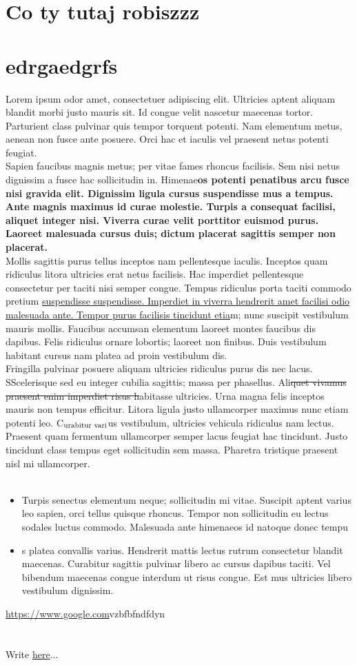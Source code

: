 \documentclass{article}
\begin{document}
\section{Co ty tutaj robiszzz}
\section{edrgaedgrfs}
Lorem ipsum odor amet, consectetuer adipiscing elit. Ultricies aptent aliquam blandit morbi justo mauris sit. Id congue velit nascetur maecenas tortor. Parturient class pulvinar quis tempor torquent potenti. Nam elementum metus, aenean non fusce ante posuere. Orci hac et iaculis vel praesent netus potenti feugiat.\\Sapien faucibus magnis metus; per vitae fames rhoncus facilisis. Sem nisi netus dignissim a fusce hac sollicitudin in. Himenae\textbf{os potenti penatibus arcu fusce nisi gravida elit. Dignissim ligula cursus suspendisse mus a tempus. Ante magnis maximus id curae molestie. Turpis a consequat facilisi, aliquet integer nisi. Viverra curae velit porttitor euismod purus. Laoreet malesuada cursus duis; dictum placerat sagittis semper non placerat.}\\Mollis sagittis purus tellus inceptos nam pellentesque iaculis. Inceptos quam ridiculus litora ultricies erat netus facilisis. Hac imperdiet pellentesque consectetur per taciti nisi semper congue. Tempus ridiculus porta taciti commodo pretium \uline{suspendisse suspendisse. Imperdiet in viverra hendrerit amet facilisi odio malesuada ante. Tempor purus facilisis tincidunt etia}m; nunc suscipit vestibulum mauris mollis. Faucibus accumsan elementum laoreet montes faucibus dis dapibus. Felis ridiculus ornare lobortis; laoreet non finibus. Duis vestibulum habitant cursus nam platea ad proin vestibulum dis.\\Fringilla pulvinar posuere aliquam ultricies ridiculus purus dis nec lacus. SScelerisque sed eu integer cubilia sagittis; massa per phasellus. Ali\sout{quet vivamus praesent enim imperdiet risus h}abitasse ultricies. Urna magna felis inceptos mauris non tempus efficitur. Litora ligula justo ullamcorper maximus nunc etiam potenti leo. C$_{\textnormal{urabitur vari}}$us vestibulum, ultricies vehicula ridiculus nam lectus. Praesent quam fermentum ullamcorper semper lacus feugiat hac tincidunt. Justo tincidunt class tempus eget sollicitudin sem massa. Pharetra tristique praesent nisl mi ullamcorper.\\\\\begin{itemize}\item Turpis senectus elementum neque; sollicitudin mi vitae. Suscipit aptent varius leo sapien, orci tellus quisque rhoncus. Tempor non sollicitudin eu lectus sodales luctus commodo. Malesuada ante himenaeos id natoque donec tempu\item s platea convallis varius. Hendrerit mattis lectus rutrum consectetur blandit maecenas. Curabitur sagittis pulvinar libero ac cursus dapibus taciti. Vel bibendum maecenas congue interdum ut risus congue. Est mus ultricies libero vestibulum dignissim.\end{itemize}
\uline{\url{https://www.google.com}}vzbfbfndfdyn
\section{}
Write \uline{here}...
\end{document}
